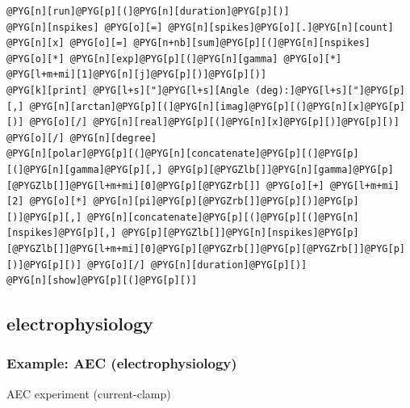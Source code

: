 \documentclass[letterpaper,10pt,english]{manual}
\begin{document}
\begin{Verbatim}[commandchars=@\[\]]
@PYG[n][run]@PYG[p][(]@PYG[n][duration]@PYG[p][)]
@PYG[n][nspikes] @PYG[o][=] @PYG[n][spikes]@PYG[o][.]@PYG[n][count]
@PYG[n][x] @PYG[o][=] @PYG[n+nb][sum]@PYG[p][(]@PYG[n][nspikes] @PYG[o][*] @PYG[n][exp]@PYG[p][(]@PYG[n][gamma] @PYG[o][*] @PYG[l+m+mi][1]@PYG[n][j]@PYG[p][)]@PYG[p][)]
@PYG[k][print] @PYG[l+s]["]@PYG[l+s][Angle (deg):]@PYG[l+s]["]@PYG[p][,] @PYG[n][arctan]@PYG[p][(]@PYG[n][imag]@PYG[p][(]@PYG[n][x]@PYG[p][)] @PYG[o][/] @PYG[n][real]@PYG[p][(]@PYG[n][x]@PYG[p][)]@PYG[p][)] @PYG[o][/] @PYG[n][degree]
@PYG[n][polar]@PYG[p][(]@PYG[n][concatenate]@PYG[p][(]@PYG[p][(]@PYG[n][gamma]@PYG[p][,] @PYG[p][@PYGZlb[]]@PYG[n][gamma]@PYG[p][@PYGZlb[]]@PYG[l+m+mi][0]@PYG[p][@PYGZrb[]] @PYG[o][+] @PYG[l+m+mi][2] @PYG[o][*] @PYG[n][pi]@PYG[p][@PYGZrb[]]@PYG[p][)]@PYG[p][)]@PYG[p][,] @PYG[n][concatenate]@PYG[p][(]@PYG[p][(]@PYG[n][nspikes]@PYG[p][,] @PYG[p][@PYGZlb[]]@PYG[n][nspikes]@PYG[p][@PYGZlb[]]@PYG[l+m+mi][0]@PYG[p][@PYGZrb[]]@PYG[p][@PYGZrb[]]@PYG[p][)]@PYG[p][)] @PYG[o][/] @PYG[n][duration]@PYG[p][)]
@PYG[n][show]@PYG[p][(]@PYG[p][)]
\end{Verbatim}


\subsection{electrophysiology}

\resetcurrentobjects
\hypertarget{--doc-examples-electrophysiology_AEC}{}

\hypertarget{index-22}{}\subsubsection{Example: AEC (electrophysiology)}

AEC experiment (current-clamp)
\end{document}
